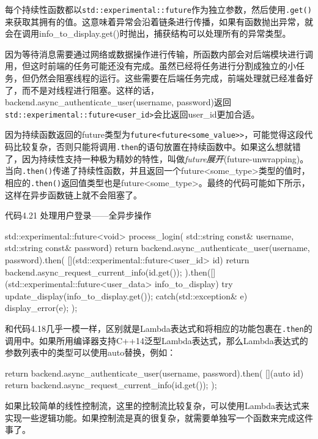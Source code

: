 每个持续性函数都以\texttt{std::experimental::future}作为独立参数，然后使用\texttt{.get()}来获取其拥有的值。这意味着异常会沿着链条进行传播，如果有函数抛出异常，就会在调用info\_to\_display.get()时抛出，捕获结构可以处理所有的异常类型。

因为等待消息需要通过网络或数据操作进行传输，所函数内部会对后端模块进行调用，但这时前端的任务可能还没有完成。虽然已经将任务进行分割成独立的小任务，但仍然会阻塞线程的运行。这些需要在后端任务完成，前端处理就已经准备好了，而不是对线程进行阻塞。这样的话，backend.async\_authenticate\_user(username, password)返回\texttt{std::experimental::future<user\_id>}会比返回user\_id更加合适。

因为持续函数返回的future类型为\texttt{future<future<some\_value>>}，可能觉得这段代码比较复杂，否则只能将调用\texttt{.then}的语句放置在持续函数中。如果这么想就错了，因为持续性支持一种极为精妙的特性，叫做\textit{future展开}(future-unwrapping)。当向\texttt{.then()}传递了持续性函数，并且返回一个future<some\_type>类型的值时，相应的\texttt{.then()}返回值类型也是future<some\_type>。最终的代码可能如下所示，这样在异步函数链上就不会阻塞了。

代码4.21  处理用户登录——全异步操作

\begin{cpp}
std::experimental::future<void> process_login(
  std::string const& username, std::string const& password)
{
  return backend.async_authenticate_user(username, password).then(
    [](std::experimental::future<user_id> id){
      return backend.async_request_current_info(id.get());
    }).then([](std::experimental::future<user_data> info_to_display){
      try{
        update_display(info_to_display.get());
      } catch(std::exception& e){
        display_error(e);
      }
    });
}
\end{cpp}

和代码4.18几乎一模一样，区别就是Lambda表达式和将相应的功能包裹在\texttt{.then}的调用中。如果所用编译器支持C++14泛型Lambda表达式，那么Lambda表达式的参数列表中的类型可以使用auto替换，例如：

\begin{cpp}
return backend.async_authenticate_user(username, password).then(
    [](auto id){
      return backend.async_request_current_info(id.get());
    });
\end{cpp}

如果比较简单的线性控制流，这里的控制流比较复杂，可以使用Lambda表达式来实现一些逻辑功能。如果控制流是真的很复杂，就需要单独写一个函数来完成这件事了。

